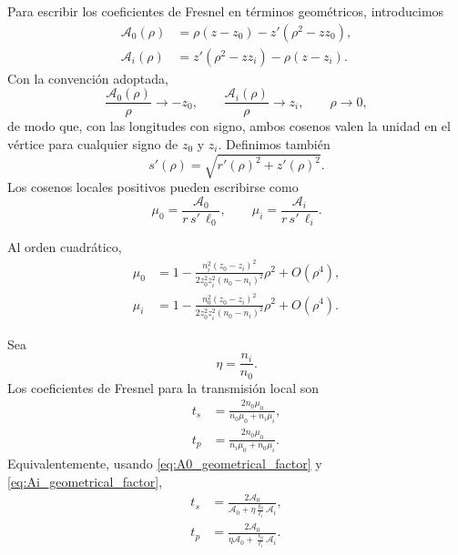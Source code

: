 Para escribir los coeficientes de Fresnel en términos geométricos, introducimos
\begin{align}
\mathcal A_0(\rho)
&=
\rho\left(z-z_0\right)
-
z'\left(\rho^2-zz_0\right),
\label{eq:A0_geometrical_factor}
\\[6pt]
\mathcal A_i(\rho)
&=
z'\left(\rho^2-zz_i\right)
-
\rho\left(z-z_i\right).
\label{eq:Ai_geometrical_factor}
\end{align}
Con la convención adoptada,
\begin{equation}
\frac{\mathcal A_0(\rho)}{\rho}
\longrightarrow
-z_0,
\qquad
\frac{\mathcal A_i(\rho)}{\rho}
\longrightarrow
z_i,
\qquad
\rho\to0,
\label{eq:A0_Ai_axis_limits}
\end{equation}
de modo que, con las longitudes con signo, ambos cosenos valen la unidad en el
vértice para cualquier signo de $z_0$ y $z_i$. Definimos también
\begin{equation}
s'(\rho)
=
\sqrt{r'(\rho)^2+z'(\rho)^2}.
\label{eq:sprime_definition}
\end{equation}
Los cosenos locales positivos pueden escribirse como
\begin{equation}
\mu_0
=
\frac{\mathcal A_0}{r\,s'\,\ell_0},
\qquad
\mu_i
=
\frac{\mathcal A_i}{r\,s'\,\ell_i}.
\label{eq:positive_direction_cosines}
\end{equation}

Al orden cuadrático,
\begin{align}
\mu_0
&=
1
-
\frac{
n_i^2(z_0-z_i)^2
}{
2z_0^2z_i^2(n_0-n_i)^2
}
\rho^2
+
O(\rho^4),
\label{eq:mu0_series_second_order}
\\[6pt]
\mu_i
&=
1
-
\frac{
n_0^2(z_0-z_i)^2
}{
2z_0^2z_i^2(n_0-n_i)^2
}
\rho^2
+
O(\rho^4).
\label{eq:mui_series_second_order}
\end{align}

Sea
\begin{equation}
\eta=\frac{n_i}{n_0}.
\label{eq:eta_definition}
\end{equation}
Los coeficientes de Fresnel para la transmisión local son
\begin{align}
t_s
&=
\frac{
2n_0\mu_0
}{
n_0\mu_0+n_i\mu_i
},
\label{eq:fresnel_ts_cosine_form}
\\[6pt]
t_p
&=
\frac{
2n_0\mu_0
}{
n_i\mu_0+n_0\mu_i
}.
\label{eq:fresnel_tp_cosine_form}
\end{align}
Equivalentemente, usando \eqref{eq:A0_geometrical_factor} y \eqref{eq:Ai_geometrical_factor},
\begin{align}
t_s
&=
\frac{
2\mathcal A_0
}{
\mathcal A_0
+
\eta
\frac{\ell_0}{\ell_i}
\mathcal A_i
},
\label{eq:fresnel_ts_exact}
\\[8pt]
t_p
&=
\frac{
2\mathcal A_0
}{
\eta\mathcal A_0
+
\frac{\ell_0}{\ell_i}
\mathcal A_i
}.
\label{eq:fresnel_tp_exact}
\end{align}


